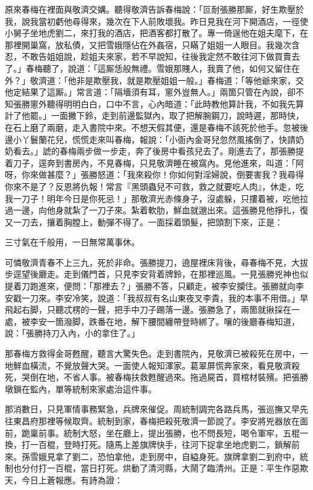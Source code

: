 原來春梅在裡面與敬濟交媾。聽得敬濟告訴春梅說：「叵耐張勝那厮，好生欺壓於我，說我當初虧他尋得來，幾次在下人前敗壞我。昨日見我在河下開酒店，一徑使小舅子坐地虎劉二，來打我的酒店，把酒客都打散了。專一倚逞他在姐夫麾下，在那裡開巢窩，放私債，又把雪娥隱佔在外姦宿，只瞞了姐姐一人眼目。我幾次含忍，不敢告姐姐說，趁姐夫來家，若不早說知，往後我定然不敢往河下做買賣去了。」春梅聽了，說道：「這厮恁般無禮。雪娥那賤人，我賣了他，如何又留住在外？」敬濟道：「他非是欺壓我，就是欺壓姐姐一般。」春梅道：「等他爺來家，交他定結果了這厮。」{}常言道：「隔墻須有耳，窻外豈無人。」兩箇只管在內說，卻不知張勝窻外聽得明明白白，口中不言，心內暗道：「此時教他算計我，不如我先算計了他罷。」{}一面撇下鈴，走到前邊監獄內，取了把解腕鋼刀，說時遲，那時快，在石上磨了兩磨，走入書院中來。不想天假其便，還是春梅不該死於他手。忽被後邊小丫鬟蘭花兒，慌慌走來叫春梅，報說：「小衙內金哥兒忽然風搖倒了，快請奶奶看去。」諕的春梅兩步做一步走，奔了後房中看孩兒去了。剛進去了，那張勝提着刀子，逕奔到書房內，不見春梅，只見敬濟睡在被窩內。見他進來，叫道：「阿呀，你來做甚麼？」張勝怒道：「我來殺你！{}你如何對淫婦說，倒要害我？我尋得你來不是了？反恩將仇報！常言『黑頭蟲兒不可救，救之就要吃人肉』，休走，吃我一刀子！明年今日是你死忌！」{}那敬濟光赤條身子，沒處躲，只摟着被，吃他拉過一邊，向他身就紮了一刀子來。紮着軟肋，鮮血就邈出來。這張勝見他掙扎，復又一刀去，攘着胸膛上，動彈不得了。一面採着頭髮，把頭割下來，{}正是：

\begin{myquote}
三寸氣在千般用，一日無常萬事休。
\end{myquote}

可憐敬濟青春不上三九，死於非命。張勝提刀，遶屋裡床背後，尋春梅不見，大拔步逕望後廳走。走到儀門首，只見李安背着牌鈴，在那裡巡風。一見張勝兇神也似提着刀跑進來，便問：「那裡去？」張勝不答，只顧走，被李安攔住。張勝就向李安戳一刀來。李安冷笑，說道：「我叔叔有名山東夜叉李貴，我的本事不用借。」早飛起右脚，只聽忒楞的一聲，把手中刀子踢落一邊。{}張勝急了，兩箇就揪採在一處，被李安一箇潑脚，跌番在地，解下腰間纏帶登時綁了。嚷的後廳春梅知道，說：「張勝持刀入內，小的拿住了。」

那春梅方救得金哥甦醒，聽言大驚失色。走到書院內，見敬濟已被殺死在房中，一地鮮血橫流，不覺放聲大哭。一面使人報知渾家。葛翠屏慌奔家來，看見敬濟殺死，哭倒在地，不省人事。被春梅扶救甦醒過來。拖過屍首，買棺材裝殯。把張勝墩鎖在監內，單等統制來家處治這件事。

那消數日，只見軍情事務緊急，兵牌來催促。周統制調完各路兵馬，張巡撫又早先往東昌府那裡等候取齊。統制到家，春梅把殺死敬濟一節說了。李安將兇器放在面前，跪稟前事。統制大怒，坐在廳上，提出張勝，也不問長短，喝令軍牢，五棍一換，打一百棍，登時打死。隨馬上差旗牌快手，往河下捉拿坐地虎劉二，鎖解前來。孫雪娥見拿了劉二，恐怕拿他，走到房中，自縊身死。旗牌拿劉二到府中，統制也分付打一百棍，當日打死。{}烘動了清河縣，大鬧了臨清州。正是：平生作惡欺天，今日上蒼報應。有詩為證：

